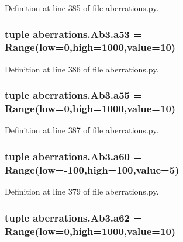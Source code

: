 Definition at line 385 of file aberrations.\-py.

\hypertarget{classaberrations_1_1_ab3_a98ddad2440f4a881b1f23b27be43e571}{
\subsubsection[{a53}]{\setlength{\rightskip}{0pt plus 5cm}tuple aberrations.\-Ab3.\-a53 = Range(low=0,high=1000,{\bf value}=10)\hspace{0.3cm}{\ttfamily [static]}}}\label{classaberrations_1_1_ab3_a98ddad2440f4a881b1f23b27be43e571}


Definition at line 386 of file aberrations.\-py.

\hypertarget{classaberrations_1_1_ab3_a5e66669d4473d75393cbb05e903bdb75}{
\subsubsection[{a55}]{\setlength{\rightskip}{0pt plus 5cm}tuple aberrations.\-Ab3.\-a55 = Range(low=0,high=1000,{\bf value}=10)\hspace{0.3cm}{\ttfamily [static]}}}\label{classaberrations_1_1_ab3_a5e66669d4473d75393cbb05e903bdb75}


Definition at line 387 of file aberrations.\-py.

\hypertarget{classaberrations_1_1_ab3_a15533015c34cc472b96642dc6a87e17f}{
\subsubsection[{a60}]{\setlength{\rightskip}{0pt plus 5cm}tuple aberrations.\-Ab3.\-a60 = Range(low=-\/100,high=100,{\bf value}=5)\hspace{0.3cm}{\ttfamily [static]}}}\label{classaberrations_1_1_ab3_a15533015c34cc472b96642dc6a87e17f}


Definition at line 379 of file aberrations.\-py.

\hypertarget{classaberrations_1_1_ab3_a8522a4f50791da0422d9c38caf9d6c67}{
\subsubsection[{a62}]{\setlength{\rightskip}{0pt plus 5cm}tuple aberrations.\-Ab3.\-a62 = Range(low=0,high=1000,{\bf value}=10)\hspace{0.3cm}{\ttfamily [static]}}}\label{classaberrations_1_1_ab3_a8522a4f50791da0422d9c38caf9d6c67}


